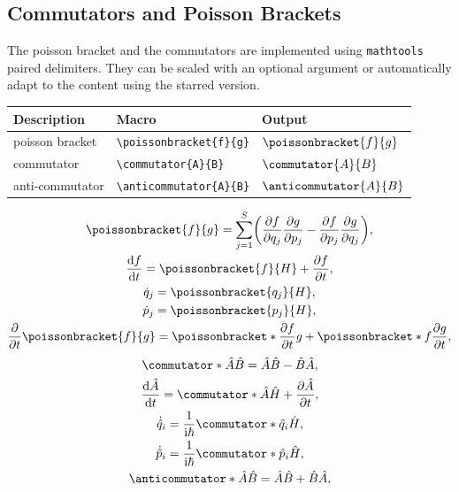 \documentclass[DIV=13]{scrartcl}
\begin{document}
\subsection{Commutators and Poisson Brackets}
The poisson bracket and the commutators are implemented using
\texttt{mathtools} paired delimiters. They can be scaled with an optional
argument or automatically adapt to the content using the starred version.
\begin{center}
  \begin{tabular}{lll}
    \toprule
    \textbf{Description} & \textbf{Macro}
                         & \textbf{Output}              \\
    \midrule
    poisson bracket      & \verb|\poissonbracket{f}{g}|
                         & $\poissonbracket{f}{g}$      \\
    commutator           & \verb|\commutator{A}{B}|
                         & $\commutator{A}{B}$          \\
    anti-commutator      & \verb|\anticommutator{A}{B}|
                         & $\anticommutator{A}{B}$      \\
    \bottomrule
  \end{tabular}
\end{center}
\begin{gather}
  \poissonbracket{f}{g} = \sum_{j=1}^S\left(
    \pdd{f}{q_j}\pdd{g}{p_j} - \pdd{f}{p_j}\pdd{g}{q_j} \right), \\
  \dd{f}{t}=\poissonbracket{f}{H}+\pdd{f}{t}, \\
  \dot{q}_j = \poissonbracket{q_j}{H}, \\
  \dot{p}_j = \poissonbracket{p_j}{H}, \\
  \pdd{}{t}\poissonbracket{f}{g} = \poissonbracket*{\pdd{f}{t}}{g} +
  \poissonbracket*{f}{\pdd{g}{t}},
\end{gather}
\begin{gather}
  \commutator*{\op{A}}{\op{B}} = \op{A}\op{B} - \op{B}\op{A}, \\
  \dd{\op{A}}{t} = \commutator*{\op{A}}{\op{H}} + \pdd{\op{A}}{t}, \\
  \dot{\op{q}}_i = \frac{1}{\i\hbar}\commutator*{\op{q}_i}{\op{H}}, \\
  \dot{\op{p}}_i = \frac{1}{\i\hbar}\commutator*{\op{p}_i}{\op{H}}, \\
  \anticommutator*{\op{A}}{\op{B}} = \op{A}\op{B} + \op{B}\op{A}, \\
\end{gather}
\end{document}
